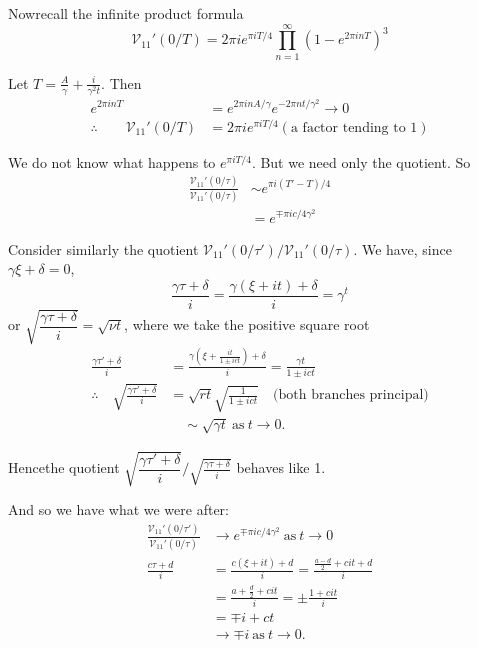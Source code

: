 Now\pageoriginale recall the infinite product formula
$$
\mathscr{V}_{11}' (0/ T)= 2 \pi i e^{\pi i T/4} \prod^\infty_{n=1} (1-
e^{2 \pi i n T})^3
$$

Let \qquad $T= \frac{A}{\gamma} + \frac{i}{\gamma^2 t}$. Then 
\begin{align*}
  e^{2 \pi i n T} & = e^{2 \pi i n A/\gamma} e^{- 2 \pi n t /\gamma^2}
  \to 0\\
  \therefore \qquad \mathscr{V}_{11}' (0/T) & = 2 \pi i e^{\pi i T/4}
  (\text{a factor tending to 1})
\end{align*}

We do not know what happens to $e^{\pi i T/4}$. But we need only the
quotient. So
\begin{align*}
  \frac{\mathscr{V}_{11}' (0/\tau)}{\mathscr{V}_{11}' (0/ \tau)} & \sim
    e^{\pi i (T' - T)/4}\\
    & = e^{\mp \pi i c/4 \gamma^2} \tag{2}\label{part2:lec15:eq2}
\end{align*}

Consider similarly the quotient $\mathscr{V}_{11}'
(0/\tau')/\mathscr{V}_{11}' (0/\tau)$. We have, since $\gamma \xi +
\delta =0$, 
$$
\frac{\gamma \tau +\delta}{i} = \frac{\gamma(\xi + i t)+ \delta}{i} =
  \gamma^t 
$$
or $\sqrt{\dfrac{\gamma \tau + \delta}{i}} = \sqrt{\nu t}$, where we take
the positive square root
\begin{align*}
\frac{\gamma \tau' + \delta}{i} & = \frac{\gamma \left(\xi + \frac{it}{1 \pm i
    c t}\right)+ \delta}{i} = \frac{\gamma t}{1 \pm i ct}\\
\therefore \quad \sqrt{\frac{\gamma \tau' + \delta}{i}} & = \sqrt{r t}
\sqrt{\frac{1}{1\pm i ct}} \quad \text{(both branches principal)}\\
& \quad \sim \sqrt{\gamma t} ~\text{as}~ t \to 0.
\end{align*}

Hence\pageoriginale the quotient $\sqrt{\dfrac{\gamma \tau'+ \delta}{i}}\Big/
\sqrt{\frac{\gamma \tau + \delta}{i}}$ behaves like 1.

And so we have what we were after:
\begin{align*}
  \frac{\mathscr{V}_{11}'(0/ \tau')}{\mathscr{V}_{11}' (0/ \tau)} &
  \to e^{\mp \pi i c /4 \gamma^2} ~\text{as}~ t \to 0 \tag{3}\label{part2:lec15:eq3}\\
  \frac{c \tau +d}{i} & = \frac{c (\xi + i t)+d}{i} =
  \frac{\frac{a-d}{2}+ c it +d}{i}\\
  & = \frac{a + \frac{d}{2} + c it}{i} = \pm \frac{1+ c i t}{i}\\
  & = \mp i + c t\\
  & \to \mp i ~\text{as}~ t \to 0.
\end{align*}

